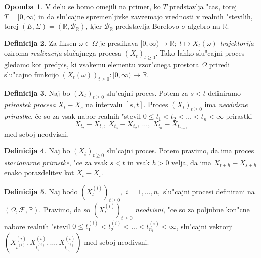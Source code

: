 \documentclass[12pt, a4paper, reqno]{amsart}
\theoremstyle{definition}
\newtheorem{definicija}{Definicija}[section]
\newtheorem{opomba}[definicija]{Opomba}
\theoremstyle{plain}
\newcommand{\R}{\mathbb{R}}
\newcommand{\F}{\mathcal{F}}
\newcommand{\B}{\mathcal{B}}
\newcommand{\Prob}{\mathbb{P}}
\newcommand{\1}{\mathds{1}}
\begin{document}
    \begin{opomba}
        V delu se bomo omejili na primer, ko $T$ predstavlja "cas, torej $T = [0, \infty)$ in da slu"cajne
        spremenljivke 
        zavzemajo vrednosti v realnih "stevilih, torej $(E, \Sigma) = (\R, \B_{\R})$, kjer $\B_\R$ 
        predstavlja Borelovo $\sigma$-algebro na $\R$.
        \label{op:Konvencije}
    \end{opomba}


    \begin{definicija}
        Za fiksen $\omega \in \Omega$ je preslikava 
        $[0, \infty) \rightarrow \mathbb{R}; \ t \mapsto X_t(\omega)$ 
        \textit{trajektorija} oziroma \textit{realizacija} slučajnega procesa $(X_t)_{t\geq0}$.
        Tako lahko slu"cajni proces gledamo kot predpis, ki vsakemu elementu vzor"cnega prostora 
        $\Omega$ priredi slu"cajno funkcijo
        $(X_t(\omega))_{t\geq0}: [0, \infty) \rightarrow \mathbb{R}$.
        \label{def:realizac}
    \end{definicija}

    \begin{definicija}
        Naj bo $(X_t)_{t\geq0}$ slu"cajni proces. Potem za $s < t$ definiramo
        \textit{prirastek procesa} $X_t - X_s$ na intervalu $[s, t]$. Proces $(X_t)_{t\geq0}$ ima 
        \textit{neodvisne prirastke}, če so za vsak nabor realnih "stevil
        $0 \leq t_1 < t_2 < \ldots < t_n < \infty$ prirastki
        $$
            X_{t_2} - X_{t_1}, \ X_{t_3} - X_{t_2}, \ \ldots, \ X_{t_n} - X_{t_{n-1}}
        $$
        med seboj neodvisni.
        \label{def:prirastek}
    \end{definicija}

    \begin{definicija}
        Naj bo $(X_t)_{t\geq0}$ slu"cajni proces. Potem pravimo, da ima proces
        \textit{stacionarne prirastke}, "ce za vsak $s < t$ in vsak $h > 0$ velja, 
        da ima $X_{t+h} - X_{s+h}$ enako porazdelitev kot $X_t - X_s$.
        \label{def:stacPrir}
    \end{definicija}

    \begin{definicija}
        Naj bodo $(X_t^{(i)})_{t\geq0},$ $i=1, \dots, n,$ slu"cajni procesi definirani na 
        $(\Omega, \F, \Prob)$. Pravimo, da so $(X_t^{(i)})_{t\geq0}$ \textit{neodvisni}, 
        "ce so za poljubne kon"cne nabore realnih "stevil $0 \leq t_1^{(i)} < t_2^{(i)} < \ldots < t_{n_i}^{(i)} < \infty$, 
        slu"cajni vektorji
        $(X_{t_1^{(i)}}^{(i)}, X_{t_2^{(i)}}^{(i)}, \ldots, X_{t_{n_i}^{(i)}}^{(i)})$ med seboj neodivsni. 
        \label{def:neodvisnostProcesov}
    \end{definicija}
\end{document}

